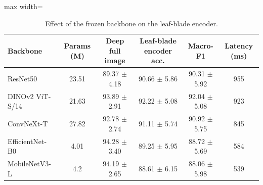 \begin{table}[tbp]
\centering
\footnotesize
\caption{Effect of the frozen backbone on the leaf-blade encoder.}
\label{tab:backbones}
\begin{adjustbox}{max width=\textwidth}
\begin{tabular}{lccccc}
\toprule
Backbone & Params (M) & Deep full image & Leaf-blade encoder acc. & Macro-F1 & Latency (ms) \\
\midrule
ResNet50 & 23.51 & 89.37 $\pm$ 4.18 & 90.66 $\pm$ 5.86 & 90.31 $\pm$ 5.92 & 955 \\
DINOv2 ViT-S/14 & 21.63 & 93.89 $\pm$ 2.91 & 92.22 $\pm$ 5.08 & 92.04 $\pm$ 5.08 & 923 \\
ConvNeXt-T & 27.82 & 92.78 $\pm$ 2.74 & 91.11 $\pm$ 5.74 & 90.92 $\pm$ 5.75 & 845 \\
EfficientNet-B0 & 4.01 & 94.28 $\pm$ 3.40 & 89.25 $\pm$ 5.95 & 88.72 $\pm$ 5.69 & 584 \\
MobileNetV3-L & 4.2 & 94.19 $\pm$ 2.65 & 88.61 $\pm$ 6.15 & 88.06 $\pm$ 5.98 & 539 \\
\bottomrule
\end{tabular}
\end{adjustbox}
\end{table}
